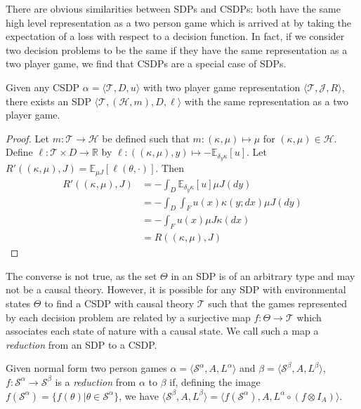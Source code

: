 There are obvious similarities between SDPs and CSDPs: both have the same high level representation as a two person game which is arrived at by taking the expectation of a loss with respect to a decision function. In fact, if we consider two decision problems to be the same if they have the same representation as a two player game, we find that CSDPs are a special case of SDPs.

\begin{theorem}\label{th:csdps_are_sdps}
Given any CSDP $\alpha=\langle \mathscr{T}, D, u \rangle$ with two player game representation $\langle \mathscr{T}, \mathscr{J}, R\rangle$, there exists an SDP $\langle \mathscr{T}, (\mathscr{H},m), D,\ell \rangle$ with the same representation as a two player game.
\end{theorem}

\begin{proof}
Let $m:\mathscr{T}\to \mathscr{H}$ be defined such that $m:(\kappa,\mu)\mapsto \mu$ for $(\kappa,\mu)\in \mathscr{H}$. Define $\ell:\mathscr{T}\times D\to \mathbb{R}$ by $\ell:((\kappa,\mu),y)\mapsto -\mathbb{E}_{\delta_y \kappa}[u]$. Let $R'((\kappa,\mu),J) = \mathbb{E}_{\mu J}[\ell(\theta,\cdot)]$. Then
\begin{align}
	R'((\kappa,\mu),J) &= -\int_D \mathbb{E}_{\delta_y \kappa}[u] \mu J(dy)\\ 
					   &= -\int_D \int_F u(x) \kappa(y;dx) \mu J(dy)\\
					   &= -\int_F u(x) \mu J \kappa(dx)\\
					   &= R((\kappa,\mu),J)
\end{align}
\end{proof}

The converse is not true, as the set $\Theta$ in an SDP is of an arbitrary type and may not be a causal theory. However, it is possible for any SDP with environmental states $\Theta$ to find a CSDP with causal theory $\mathscr{T}$ such that the games represented by each decision problem are related by a surjective map $f:\Theta\to \mathscr{T}$ which associates each state of nature with a causal state. We call such a map a \emph{reduction} from an SDP to a CSDP.

\begin{definition}[Reduction]\label{def:red_sdp_CSDP}
Given normal form two person games $\alpha = \langle \mathscr{S}^\alpha, A, L^\alpha\rangle$ and $\beta = \langle \mathscr{S}^\beta, A, L^\beta \rangle$, $f:\mathscr{S}^\alpha\to \mathscr{S}^\beta$ is a \emph{reduction} from $\alpha$ to $\beta$ if, defining the image $f(\mathscr{S}^\alpha)=\{f(\theta)|\theta\in \mathscr{S}^\alpha\}$, we have $\langle \mathscr{S}^\beta, A, L^\beta \rangle = \langle f(\mathscr{S}^\alpha), A, L^\alpha\circ(f\otimes I_A)\rangle$.
\end{definition}

